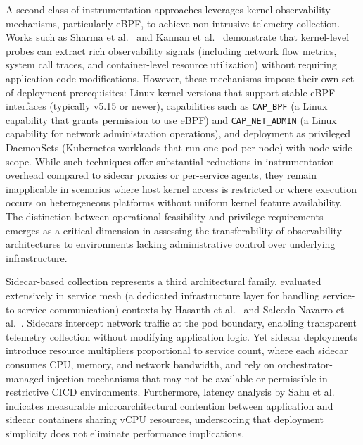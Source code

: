 A second class of instrumentation approaches leverages kernel observability mechanisms, particularly \gls{eBPF}, to achieve non-intrusive telemetry collection. Works such as Sharma et al.~\cite{sharmaEBPFEnhancedCompleteObservability2024} and Kannan et al.~\cite{kannanDesigningLightweightNetwork2024} demonstrate that kernel-level probes can extract rich observability signals (including network flow metrics, system call traces, and container-level resource utilization) without requiring application code modifications. However, these mechanisms impose their own set of deployment prerequisites: Linux kernel versions that support stable \gls{eBPF} interfaces (typically v5.15 or newer), capabilities such as \texttt{CAP\_BPF} (a Linux capability that grants permission to use \gls{eBPF}) and \texttt{CAP\_NET\_ADMIN} (a Linux capability for network administration operations), and deployment as privileged DaemonSets (Kubernetes workloads that run one pod per node) with node-wide scope. While such techniques offer substantial reductions in instrumentation overhead compared to sidecar proxies or per-service agents, they remain inapplicable in scenarios where host kernel access is restricted or where execution occurs on heterogeneous platforms without uniform kernel feature availability. The distinction between operational feasibility and privilege requirements emerges as a critical dimension in assessing the transferability of observability architectures to environments lacking administrative control over underlying infrastructure.

Sidecar-based collection represents a third architectural family, evaluated extensively in service mesh (a dedicated infrastructure layer for handling service-to-service communication) contexts by Hasanth et al.~\cite{hasanthEvaluatingPerformanceSidecarbased2024} and Salcedo-Navarro et al.~\cite{salcedo-navarroK8sidecarModularKubernetes2025}. Sidecars intercept network traffic at the pod boundary, enabling transparent telemetry collection without modifying application logic. Yet sidecar deployments introduce resource multipliers proportional to service count, where each sidecar consumes CPU, memory, and network bandwidth, and rely on orchestrator-managed injection mechanisms that may not be available or permissible in restrictive \ac{CICD} environments. Furthermore, latency analysis by Sahu et al.~\cite{sahuSidecarsCentralLane2023} indicates measurable microarchitectural contention between application and sidecar containers sharing vCPU resources, underscoring that deployment simplicity does not eliminate performance implications.


